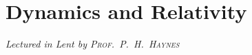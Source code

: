 \chapter[Dynamics and Relativity \\ \textnormal{\emph{Lectured in Lent \oldstylenums{2021} by \textsc{Prof.\ P.\ H.\ Haynes}}}]{Dynamics and Relativity}
\emph{\Large Lectured in Lent  by \textsc{Prof.\ P.\ H.\ Haynes}}

